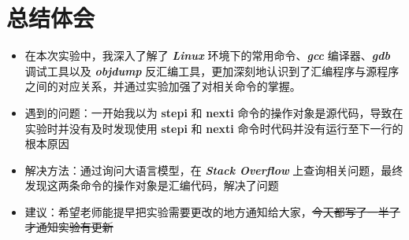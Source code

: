 \documentclass[UTF8, 12pt, a4paper, oneside]{ctexart}
\begin{document}
    \section{总结体会}
        \begin{itemize}
            \item 在本次实验中，我深入了解了 \textbf{\textit{Linux}} 环境下的常用命令、\textbf{\textit{gcc}} 编译器、\textbf{\textit{gdb}} 调试工具以及 \textbf{\textit{objdump}} 反汇编工具，更加深刻地认识到了汇编程序与源程序之间的对应关系，并通过实验加强了对相关命令的掌握。
            \item 遇到的问题：一开始我以为 \textbf{stepi} 和 \textbf{nexti} 命令的操作对象是源代码，导致在实验时并没有及时发现使用 \textbf{stepi} 和 \textbf{nexti} 命令时代码并没有运行至下一行的根本原因
            \item 解决方法：通过询问大语言模型，在 \textbf{\textit{Stack Overflow}} 上查询相关问题，最终发现这两条命令的操作对象是汇编代码，解决了问题
            \item 建议：希望老师能提早把实验需要更改的地方通知给大家，\sout{今天都写了一半了才通知实验有更新}
        \end{itemize}
\end{document}
